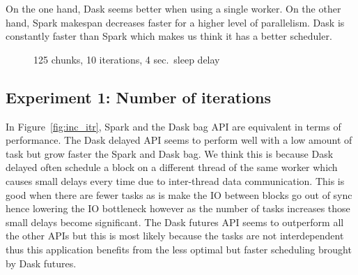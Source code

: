 \documentclass[conference]{IEEEtran}
\begin{document}
On the one hand, Dask seems better when using a single worker. On the other hand,
Spark makespan decreases faster for a higher level of parallelism. Dask is constantly
faster than Spark which makes us think it has a better scheduler.

\begin{figure}[!t]
    \centering
    
    \caption{125 chunks, 10 iterations, 4 sec.\ sleep delay}\label{fig:inc_worker}
\end{figure}



\subsection{Experiment 1: Number of iterations}
In Figure~\ref{fig:inc_itr}, Spark and the Dask bag API are equivalent in terms of
performance. The Dask delayed API seems to perform well with a low amount of task but
grow faster the Spark and Dask bag. We think this is because Dask delayed often
schedule a block on a different thread of the same worker which causes small delays
every time due to inter-thread data communication. This is good when there are fewer
tasks as is make the IO between blocks go out of sync hence lowering the IO
bottleneck however as the number of tasks increases those small delays become
significant. The Dask futures API seems to outperform all the other APIs but this is
most likely because the tasks are not interdependent thus this application benefits
from the less optimal but faster scheduling brought by Dask futures.
\end{document}
